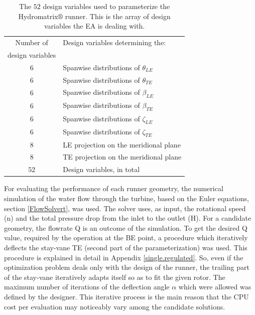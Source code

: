 \begin{table}[h!]
\begin{center}
\begin{tabular}{ |c|l| }
\hline

Number of              & Design variables determining the:\\
design variables       & \\
\hline
6 & Spanwise distributions of $\theta_{LE}$\\
\hline
6 & Spanwise distributions of $\theta_{TE}$\\
\hline
6 & Spanwise distributions of $\beta_{LE}$\\
\hline
6 & Spanwise distributions of $\beta_{TE}$\\
\hline
6 & Spanwise distributions of $\zeta_{LE}$\\
\hline
6 & Spanwise distributions of $\zeta_{TE}$\\
\hline
8 & LE projection on the meridional plane\\
\hline
8 & TE projection on the meridional plane\\
\hline
\hline
$52$ & Design variables, in total \\
\hline   
\end{tabular}
\caption{
The $52$ design variables used to parameterize the Hydromatrix$\circledR$ runner. This is the array of design variables the EA is dealing with.}
\label{design_vars2}
\end{center}
\end{table}

For evaluating the performance of each runner geometry, the numerical simulation of the water flow through the turbine, based on the Euler equations, section \ref{FlowSolvert}, was used. The solver uses, as input, the rotational speed (n) and the total pressure drop from  the inlet to the outlet (H). For a candidate geometry, the flowrate Q is an outcome of the simulation. To get the desired Q value, required by the operation at the BE point, a procedure which iteratively deflects the stay-vane TE (second part of the parameterization) was used. This procedure is explained in detail in Appendix \ref{single.regulated}. So, even if the optimization problem deals only with the design of the runner, the trailing part of the stay-vane iteratively adapts itself so as to fit the given rotor. The maximum number of iterations of the deflection angle $\alpha$ which were allowed was defined by the designer. This iterative process is the main reason that the CPU cost per evaluation may noticeably vary among the candidate solutions.



